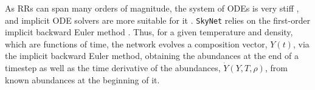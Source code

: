 %
As \acp{RR} can span many orders of magnitude, 
the system of \acp{ODE} is very stiff \citep{Timmes:1999,Hix:2005pf}, and implicit \ac{ODE} solvers 
are more suitable for it \citep{Timmes:1999,Winteler:2012,Longland:2014}.
\texttt{SkyNet} relies on the first-order implicit backward Euler method \citep{Hix:1999}. %
%
Thus, for a given temperature and density, which are functions of time, 
the network evolves a composition vector, $Y(t)$, via the implicit 
backward Euler method, obtaining the abundances at the end of a timestep 
as well as the time derivative of the abundances, $\dot{Y}(Y,T,\rho)$,  
from known abundances at the beginning of it. 
%

